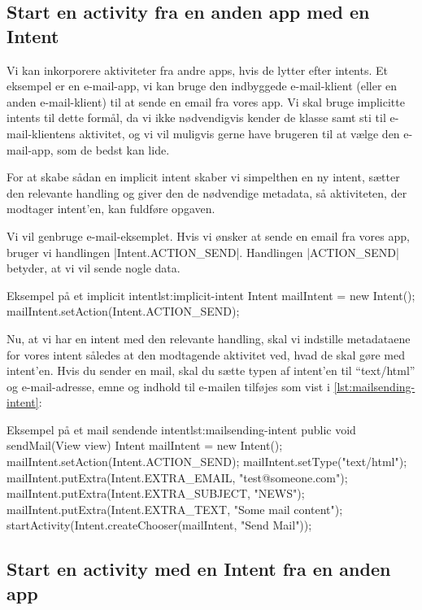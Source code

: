 \subsection{Start en activity fra en anden app med en Intent}

Vi kan inkorporere aktiviteter fra andre apps, hvis de lytter efter intents. Et eksempel er en e-mail-app, vi kan bruge den indbyggede e-mail-klient (eller en anden e-mail-klient) til at sende en email fra vores app. Vi skal bruge implicitte intents til dette formål, da vi ikke nødvendigvis kender de klasse samt sti til e-mail-klientens aktivitet, og vi vil muligvis gerne have brugeren til at vælge den e-mail-app, som de bedst kan lide.

For at skabe sådan en implicit intent skaber vi simpelthen en ny intent, sætter den relevante handling og giver den de nødvendige metadata, så aktiviteten, der modtager intent'en, kan fuldføre opgaven.

Vi vil genbruge e-mail-eksemplet. Hvis vi ønsker at sende en email fra vores app, bruger vi handlingen \JavaInline|Intent.ACTION_SEND|. Handlingen \JavaInline|ACTION_SEND| betyder, at vi vil sende nogle data.

\begin{JavaCode}{Eksempel på et implicit intent}{lst:implicit-intent}
	Intent mailIntent = new Intent();
	mailIntent.setAction(Intent.ACTION_SEND);
\end{JavaCode}

Nu, at vi har en intent med den relevante handling, skal vi indstille metadataene for vores intent således at den modtagende aktivitet ved, hvad de skal gøre med intent'en. Hvis du sender en mail, skal du sætte typen af intent'en til ``text/html'' og e-mail-adresse, emne og indhold til e-mailen tilføjes som vist i \autoref{lst:mailsending-intent}:

\begin{JavaCode}{Eksempel på et mail sendende intent}{lst:mailsending-intent}
	public void sendMail(View view) {
		Intent mailIntent = new Intent();
		mailIntent.setAction(Intent.ACTION_SEND);
		mailIntent.setType("text/html");
		mailIntent.putExtra(Intent.EXTRA_EMAIL, "test@someone.com");
		mailIntent.putExtra(Intent.EXTRA_SUBJECT, "NEWS");
		mailIntent.putExtra(Intent.EXTRA_TEXT, "Some mail content");
		startActivity(Intent.createChooser(mailIntent, "Send Mail"));
	}
\end{JavaCode}

\subsection{Start en activity med en Intent fra en anden app}

